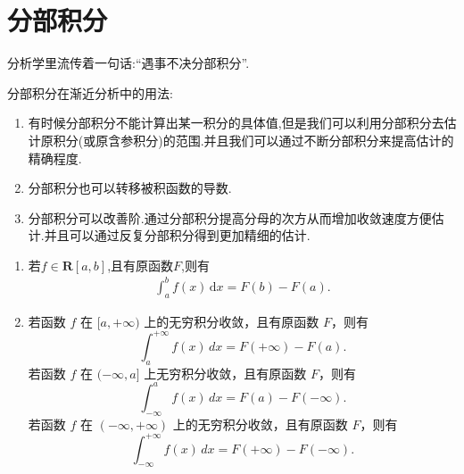 \documentclass[../../main.tex]{subfiles}
\begin{document}
\section{分部积分}

分析学里流传着一句话:“遇事不决分部积分”.

分部积分在渐近分析中的用法:
\begin{enumerate}[(1)]
\item\label{分部积分在渐近分析中的用法(1)} 有时候分部积分不能计算出某一积分的具体值,但是我们可以利用分部积分去估计原积分(或原含参积分)的范围.并且我们可以通过不断分部积分来提高估计的精确程度.

\item\label{分部积分在渐近分析中的用法(2)} 分部积分也可以转移被积函数的导数.

\item\label{分部积分在渐近分析中的用法(3)} 分部积分可以改善阶.通过分部积分提高分母的次方从而增加收敛速度方便估计.并且可以通过反复分部积分得到更加精细的估计.
\end{enumerate}

\begin{theorem}\label{theorem:Newton-Leibniz公式}
\begin{enumerate}
\item 若$f\in \mathbf{R}[a,b]$,且有原函数$F$,则有
\begin{align*}
\int_a^b{f\left( x \right) \,\mathrm{d}x}=F\left( b \right) -F\left( a \right) .
\end{align*}

\item 若函数 \( f \) 在 \([a, +\infty)\) 上的无穷积分收敛，且有原函数 \( F \)，则有
\[
\int_a^{+\infty} f(x) \, dx = F(+\infty) - F(a).
\]
若函数 \( f \) 在 \((-\infty, a]\) 上无穷积分收敛，且有原函数 \( F \)，则有
\[
\int_{-\infty}^a f(x) \, dx = F(a) - F(-\infty).
\]
若函数 \( f \) 在 \((-\infty, +\infty)\) 上的无穷积分收敛，且有原函数 \( F \)，则有
\[
\int_{-\infty}^{+\infty} f(x) \, dx = F(+\infty) - F(-\infty).
\]
\end{enumerate}
\end{theorem}
\end{document}
